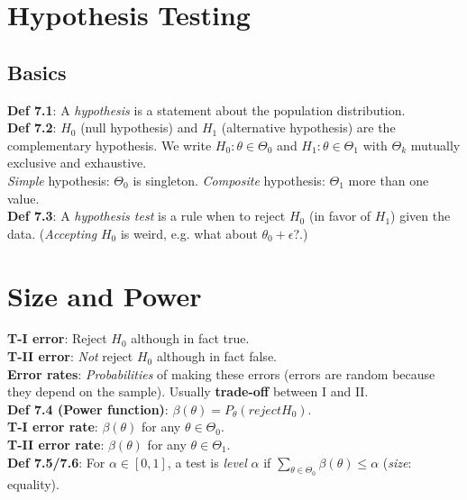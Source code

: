 \section{Hypothesis Testing}
\subsection{Basics}
\textbf{Def 7.1}: A \emph{hypothesis} is a statement about the population distribution.\\
\textbf{Def 7.2}: $H_0$ (null hypothesis) and $H_1$ (alternative hypothesis) are the complementary hypothesis. We write $H_0:\theta\in\Theta_0$ and $H_1:\theta\in\Theta_1$ with $\Theta_k$ mutually exclusive and exhaustive.\\
\emph{Simple} hypothesis: $\Theta_0$ is singleton. \emph{Composite} hypothesis: $\Theta_1$ more than one value.\\
\textbf{Def 7.3}: A \emph{hypothesis test} is a rule when to reject $H_0$ (in favor of $H_1$) given the data. \footnotesize{(\textit{Accepting} $H_0$ is weird, e.g. what about $\theta_0+\epsilon$?.)}\\

\section{Size and Power}
\textbf{T-I error}: Reject $H_0$ although in fact true.\\
\textbf{T-II error}: \emph{Not} reject $H_0$ although in fact false.\\
\textbf{Error rates}: \emph{Probabilities} of making these errors \footnotesize{(errors are random because they depend on the sample)}. Usually \textbf{trade-off} between I and II.\\
\textbf{Def 7.4 (Power function)}: $\beta(\theta) = P_\theta(reject H_0)$.\\
\textbf{T-I error rate}: $\beta(\theta)$ for any $\theta\in\Theta_0$.\\
\textbf{T-II error rate}: $\beta(\theta)$ for any $\theta\in\Theta_1$.\\
\textbf{Def 7.5/7.6}: For $\alpha\in[0,1]$, a test is \emph{level} $\alpha$ if $\sum_{\theta\in\Theta_0}\beta(\theta)\leq\alpha$ (\emph{size}: equality).\\

